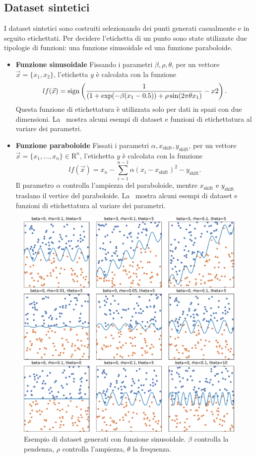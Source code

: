 \subsection{Dataset sintetici}
I dataset sintetici sono costruiti selezionando dei punti generati casualmente e in seguito etichettati.
Per decidere l'etichetta di un punto sono state utilizzate due tipologie di funzioni: una funzione sinusoidale ed una funzione paraboloide.
\begin{itemize}
    \item \textbf{Funzione sinusoidale} Fissando i parametri $\beta,\rho,\theta$, per un vettore $\Vec{x}=\{x_1,x_2\}$, l'etichetta $y$ è calcolata con la funzione
    \begin{equation}\label{eq:sinusoid_dataset_lf}
    lf(\Vec{x}) = \mathrm{sign}\left(\frac{1}{(1 + \exp(-\beta(x_1 - 0.5)) + \rho \sin(2\pi\theta x_1)} - x2\right).
    \end{equation}
    Questa funzione di etichettatura è utilizzata solo per dati in spazi con due dimensioni. La~ mostra alcuni esempi di dataset e funzioni di etichettatura al variare dei parametri.

    \item \textbf{Funzione paraboloide} Fissati i parametri $\alpha, x_\text{shift}, y_\text{shift}$, per un vettore $\Vec{x}=\{x_1, \dots, x_n\} \in \mathrm{R}^n$, l'etichetta $y$ è calcolata con la funzione
    \begin{equation}\label{eq:pacman_dataset_lf}
    lf(\Vec{x})= x_n - \sum_{i=1}^{n-1}\alpha(x_i - x_\text{shift})^2 - y_\text{shift}.
    \end{equation}
    Il parametro $\alpha$ controlla l'ampiezza del paraboloide, mentre $x_\text{shift}$ e $y_\text{shift}$ traslano il vertice del paraboloide.
    La~ mostra alcuni esempi di dataset e funzioni di etichettatura al variare dei parametri.
\end{itemize}
\begin{figure}
    \centering
    \includegraphics[width=.7\linewidth]{img/sinusoid_dataset_param_influence.pdf}
    \caption{Esempio di dataset generati con funzione sinusoidale. 
    $\beta$ controlla la pendenza, $\rho$ controlla l'ampiezza, $\theta$ la frequenza.}
    \label{fig:sinusoid_dataset}
\end{figure}
